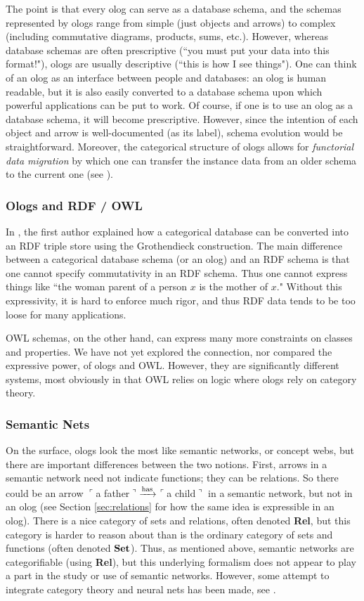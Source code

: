 \documentclass{amsart}
\def\To{\xrightarrow}
\def\To{\xrightarrow}
\def\Set{{\bf Set}}
\newcommand{\fakebox}[1]{\tn{$\ulcorner$#1$\urcorner$}}
\theoremstyle{remark}
\theoremstyle{definition}
\def\tn{\textnormal}
\begin{document}
The point is that every olog can serve as a database schema, and the schemas represented by ologs range from simple (just objects and arrows) to complex (including commutative diagrams, products, sums, etc.). However, whereas database schemas are often prescriptive (``you must put your data into this format!"), ologs are usually descriptive (``this is how I see things"). One can think of an olog as an interface between people and databases: an olog is human readable, but it is also easily converted to a database schema upon which powerful applications can be put to work. Of course, if one is to use an olog as a database schema, it will become prescriptive. However, since the intention of each object and arrow is well-documented (as its label), schema evolution would be straightforward. Moreover, the categorical structure of ologs allows for {\em functorial data migration} by which one can transfer the instance data from an older schema to the current one (see \cite{Spi-FDM}).


\subsubsection{Ologs and RDF / OWL}

In \cite{Spi-FDM}, the first author explained how a categorical database can be converted into an RDF triple store using the Grothendieck construction. The main difference between a categorical database schema (or an olog) and an RDF schema is that one cannot specify commutativity in an RDF schema. Thus one cannot express things like ``the woman parent of a person $x$ is the mother of $x$."  Without this expressivity, it is hard to enforce much rigor, and thus RDF data tends to be too loose for many applications. 

OWL schemas, on the other hand, can express many more constraints on classes and properties. We have not yet explored the connection, nor compared the expressive power, of ologs and OWL. However, they are significantly different systems, most obviously in that OWL relies on logic where ologs rely on category theory. 

\subsubsection{Semantic Nets}

On the surface, ologs look the most like semantic networks, or concept webs, but there are important differences between the two notions. First, arrows in a semantic network need not indicate functions; they can be relations. So there could be an arrow \fakebox{a father}$\To{\tn{has}}$\fakebox{a child} in a semantic network, but not in an olog (see Section \ref{sec:relations} for how the same idea is expressible in an olog). There is a nice category of sets and relations, often denoted {\bf Rel}, but this category is harder to reason about than is the ordinary category of sets and functions (often denoted $\Set$). Thus, as mentioned above, semantic networks are categorifiable (using {\bf Rel}), but this underlying formalism does not appear to play a part in the study or use of semantic networks. However, some attempt to integrate category theory and neural nets has been made, see \cite{HC}.
\end{document}
